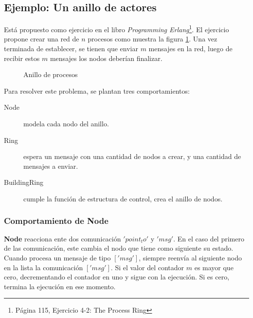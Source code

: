 \subsection{Ejemplo: Un anillo de actores}
Está propuesto como ejercicio en el libro \textit{Programming Erlang}\cite{Cesarini:2009:EP:1717841}\footnote{Página 115, Ejercicio 4-2: The Process Ring}. El ejercicio propone crear una red de $n$ procesos como muestra la figura \ref{fig:anillo}. Una vez terminada de establecer, se tienen que enviar $m$ mensajes en la red, luego de recibir estos $m$ mensajes los nodos deberían finalizar.


\begin{figure}[H]
\centering
{}
\caption{Anillo de procesos}
\label{fig:anillo}
\end{figure}

Para resolver este problema, se plantan tres comportamientos:

\begin{description}
 \item [Node] modela cada nodo del anillo.
 \item [Ring] espera un mensaje con una cantidad de nodos a crear, y una cantidad de mensajes a enviar.
 \item [BuildingRing] cumple la función de estructura de control, crea el anillo de nodos.
\end{description}

\subsubsection*{Comportamiento de Node}

\textbf{Node} reacciona ente dos comunicación $'point_to'$ y $'msg'$. En el caso del primero de las comunicación, este cambia el nodo que tiene como siguiente su estado.
Cuando procesa un mensaje de tipo $['msg']$, siempre reenvía al siguiente nodo en la lista la comunicación $['msg']$. Si el valor del contador $m$ es mayor que cero, decrementando el contador en uno y sigue con la ejecución. Si es cero, termina la ejecución en ese momento.

